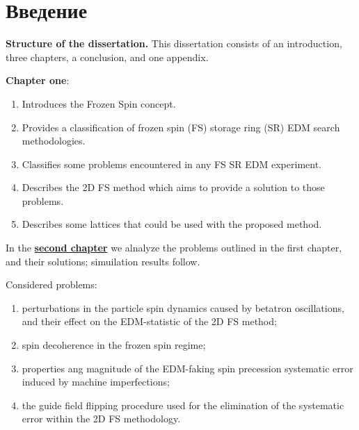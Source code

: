 \chapter*{Введение}                         %

\newcommand{\actuality}{}
\newcommand{\progress}{}
\newcommand{\aim}{{\textbf\aimTXT}}
\newcommand{\tasks}{\textbf{\tasksTXT}}
\newcommand{\novelty}{\textbf{\noveltyTXT}}
\newcommand{\influence}{\textbf{\influenceTXT}}
\newcommand{\methods}{\textbf{\methodsTXT}}
\newcommand{\defpositions}{\textbf{\defpositionsTXT}}
\newcommand{\reliability}{\textbf{\reliabilityTXT}}
\newcommand{\probation}{\textbf{\probationTXT}}
\newcommand{\contribution}{\textbf{\contributionTXT}}
\newcommand{\publications}{\textbf{\publicationsTXT}}


\textbf{Structure of the dissertation.} This dissertation consists of an introduction, three chapters,
a conclusion, and one appendix.

\textbf{Chapter one}: 
\begin{enumerate}
	\item Introduces the Frozen Spin concept.
	\item Provides a classification of frozen spin (FS) storage ring (SR) EDM search methodologies.
	\item Classifies some problems encountered in any FS SR EDM experiment.
	\item Describes the 2D FS method which aims to provide a solution to those problems.
	\item Describes some lattices that could be used with the proposed method.
\end{enumerate}

In the \underline{\textbf{second chapter}} we alnalyze the problems outlined in the first chapter, and their solutions; simuilation results follow. 

Considered problems:
\begin{enumerate}
	\item perturbations in the particle spin dynamics caused by betatron oscillations, and their effect on the EDM-statistic of the 2D FS method;
	\item spin decoherence in the frozen spin regime;
	\item properties ang magnitude of the EDM-faking spin precession systematic error induced by machine imperfections;
	\item the guide field flipping procedure used for the elimination of the systematic error within the 2D FS methodology.
\end{enumerate}

